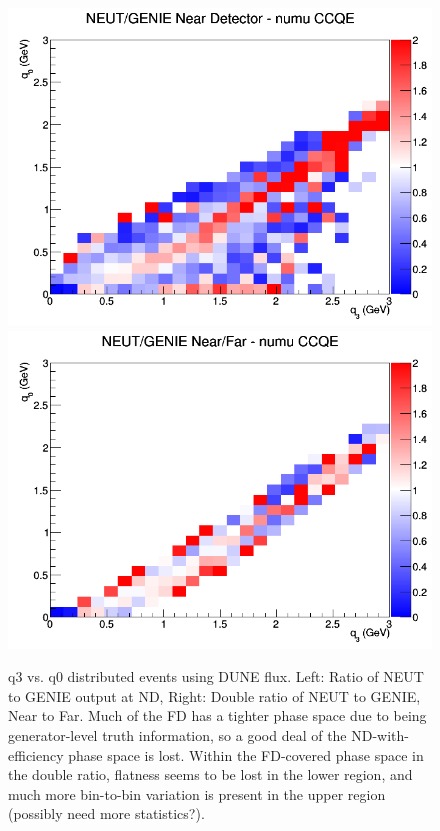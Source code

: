 \documentclass[12pt]{article}
\begin{document}
\newline
\begin{figure}[h]
\includegraphics[width=\linewidth]{eff_q0_q3_ratios/CCQE_NEUT_GENIE_numu_near_q3_q0.png}
\endminipage
{}
\includegraphics[width=\linewidth]{eff_q0_q3_ratios/CCQE_NEUT_GENIE_numu_NF_q3_q0.png}
\endminipage
\caption{q3 vs. q0 distributed events using DUNE flux. Left: Ratio of NEUT to GENIE output at ND, Right: Double ratio of NEUT to GENIE, Near to Far. Much of the FD has a tighter phase space due to being generator-level truth information, so a good deal of the ND-with-efficiency phase space is lost. Within the FD-covered phase space in the double ratio, flatness seems to be lost in the lower region, and much more bin-to-bin variation is present in the upper region (possibly need more statistics?).}
\end{figure}
\FloatBarrier
\end{document}
